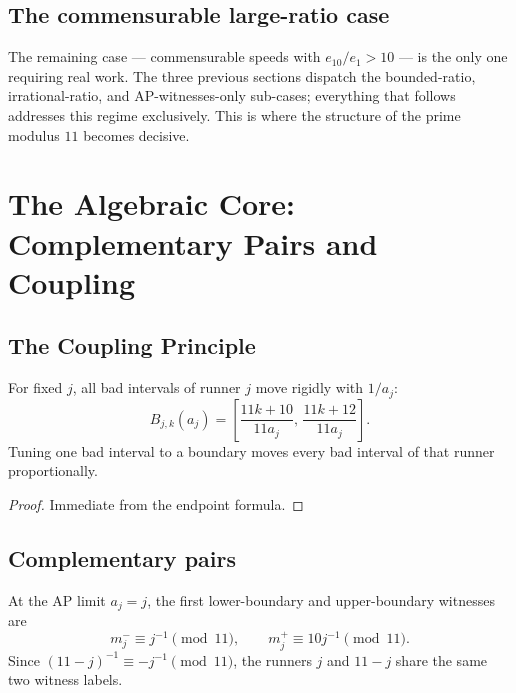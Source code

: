 \documentclass[12pt]{article}
\begin{document}
\subsection{The commensurable large-ratio case}

The remaining case — commensurable speeds with $e_{10}/e_1>10$ — is the only one requiring
real work. The three previous sections dispatch the bounded-ratio, irrational-ratio, and
AP-witnesses-only sub-cases; everything that follows addresses this regime exclusively.
This is where the structure of the prime modulus $11$ becomes decisive.



\section{The Algebraic Core: Complementary Pairs and Coupling}

\subsection{The Coupling Principle}

\begin{lemma}\label{l:41}
For fixed $j$, all bad intervals of runner $j$ move
rigidly with $1/a_j$:
\[
B_{j,k}(a_j) = \left[\frac{11k+10}{11a_j},\,\frac{11k+12}{11a_j}\right].
\]
Tuning one bad interval to a boundary moves every bad interval of that runner
proportionally.

\end{lemma}
\begin{proof}
Immediate from the endpoint formula.
\end{proof}

\subsection{Complementary pairs}

At the AP limit $a_j=j$, the first lower-boundary and upper-boundary witnesses are
\[
m_j^- \equiv j^{-1}\pmod{11},\qquad m_j^+ \equiv 10j^{-1}\pmod{11}.
\]
Since $(11-j)^{-1}\equiv -j^{-1}\pmod{11}$, the runners $j$ and $11-j$ share the same
two witness labels.
\end{document}
